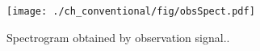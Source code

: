 \documentclass[honka]{nitkagawathesis}%
\begin{document}
% 

\begin{figure}[tb]
\centering
\texttt{[image: ./ch\_conventional/fig/obsSpect.pdf]}
\caption{Spectrogram obtained by observation signal..}
\label{fig:obsspect}
\end{figure}

\appendix

%
\end{document}
